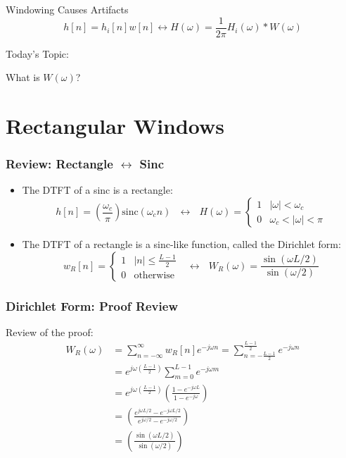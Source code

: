 \documentclass{beamer}
\begin{document}
\begin{frame}
  \begin{block}{Windowing Causes Artifacts}
    \[
    h[n] = h_{i}[n]w[n] \leftrightarrow H(\omega) = \frac{1}{2\pi}H_i(\omega)\ast W(\omega)
    \]
  \end{block}
  \begin{block}{Today's Topic:}
    \centerline{What is $W(\omega)$?}
  \end{block}
\end{frame}

\section[Rectangular]{Rectangular Windows}
\setcounter{subsection}{1}

\begin{frame}
  \frametitle{Review: Rectangle $\leftrightarrow$ Sinc}

  \begin{itemize}
  \item The DTFT of a sinc is a rectangle:
    \begin{displaymath}
      h[n] = \left(\frac{\omega_c}{\pi}\right)\mbox{sinc}(\omega_c n)
      ~~~\leftrightarrow~~~
      H(\omega)=\begin{cases}1&|\omega|<\omega_c\\
      0 & \omega_c<|\omega|<\pi
      \end{cases}
    \end{displaymath}
  \item The DTFT of a rectangle is a sinc-like function, called the
    Dirichlet form:
    \begin{displaymath}
      w_R[n] = \begin{cases}
        1 & |n|\le \frac{L-1}{2}\\
        0 &\mbox{otherwise}
      \end{cases}
      ~~~\leftrightarrow~~~
      W_R(\omega)= \frac{\sin(\omega L/2)}{\sin(\omega/2)}
    \end{displaymath}
  \end{itemize}
\end{frame}

\begin{frame}
  \frametitle{Dirichlet Form: Proof Review}

  Review of the proof:
  \begin{align*}
    W_R(\omega) &= \sum_{n=-\infty}^\infty w_R[n]e^{-j\omega n}
    = \sum_{n=-\frac{L-1}{2}}^{\frac{L-1}{2}} e^{-j\omega n}\\
    &= e^{j\omega\left(\frac{L-1}{2}\right)} \sum_{m=0}^{L-1} e^{-j\omega m}\\
    &= e^{j\omega\left(\frac{L-1}{2}\right)} \left(\frac{1-e^{-j\omega L}}{1-e^{-j\omega}}\right)\\
    &= \left(\frac{e^{j\omega L/2}-e^{-j\omega L/2}}{e^{j\omega/2}-e^{-j\omega/2}}\right)\\
    &= \left(\frac{\sin(\omega L/2)}{\sin(\omega/2)}\right)
  \end{align*}
\end{frame}
\end{document}
